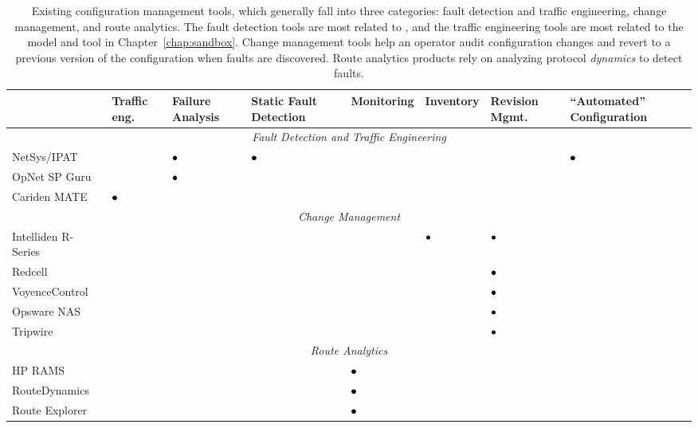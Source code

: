 \begin{table}
\begin{footnotesize}
\begin{tabular}{l|p{0.35in}|p{0.5in}|p{0.5in}|p{0.6in}|p{0.5in}|p{0.5in}|p{0.5in}}
& {\bf Traffic eng.} & {\bf Failure Analysis} & {\bf Static Fault Detection} & {\bf Monitoring} &
{\bf Inventory} & {\bf Revision Mgmt.} & {\bf ``Automated'' Configuration} \\ \hline
\multicolumn{8}{c}{{\em Fault Detection and Traffic Engineering}} \\ \hline
NetSys/IPAT~\cite{www-wandl-ipat} & & $\bullet$ & $\bullet$ &  & & & $\bullet$ \\
OpNet SP Guru~\cite{www-opnet-spguru} & & $\bullet$ &  & & & & \\ 
Cariden MATE~\cite{www-cariden-mate} & $\bullet$ & & & & & \\ 
\hline
\multicolumn{8}{c}{{\em Change Management}} \\ \hline
Intelliden R-Series~\cite{www-intelliden} &  & & & & $\bullet$ & $\bullet$ & \\
Redcell~\cite{www-redcell} &  & & & & & $\bullet$ & \\
VoyenceControl~\cite{www-voyencecontrol} &  & & & & & $\bullet$ & \\
Opsware NAS~\cite{www-opsware} &  & & & & & $\bullet$ & \\
Tripwire~\cite{www-tripwire} &  & & & & & $\bullet$ & \\ \hline
\multicolumn{8}{c}{{\em Route Analytics}} \\ \hline
HP RAMS~\cite{www-hp-rams} & & & & $\bullet$ & & & \\
RouteDynamics~\cite{www-ipsumnetworks} &  & & & $\bullet$ & & & \\
Route Explorer~\cite{www-packetdesign} & & & & $\bullet$ & & & \\
\end{tabular}
\end{footnotesize}
\caption[Existing configuration management tools]{Existing configuration
management tools, which 
generally fall into three categories: fault detection and traffic
engineering, change management, and route analytics.  The fault
detection tools are most related to \rccns, and the traffic engineering
tools are most related to the model and tool in
Chapter~\ref{chap:sandbox}.  Change management tools 
help an operator audit configuration changes and revert to a previous
version of the configuration when faults are discovered.  Route
analytics products rely on analyzing protocol {\em dynamics} to detect
faults.}
\label{tab:mgmt}
\end{table}


